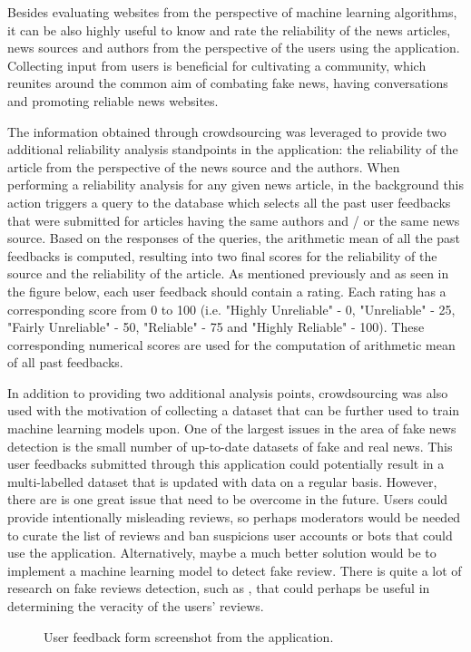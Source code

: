Besides evaluating websites from the perspective of machine learning algorithms, it can be also highly useful to know and rate the reliability of the news articles, news sources and authors from the perspective of the users using the application. Collecting input from users is beneficial for cultivating a community, which reunites around the common aim of combating fake news, having conversations and promoting reliable news websites.

The information obtained through crowdsourcing was leveraged to provide two additional reliability analysis standpoints in the application: the reliability of the article from the perspective of the news source and the authors. When performing a reliability analysis for any given news article, in the background this action triggers a query to the database which selects all the past user feedbacks that were submitted for articles having the same authors and / or the same news source. Based on the responses of the queries, the arithmetic mean of all the past feedbacks is computed, resulting into two final scores for the reliability of the source and the reliability of the article. As mentioned previously and as seen in the figure below, each user feedback should contain a rating. Each rating has a corresponding score from 0 to 100 (i.e. "Highly Unreliable" - 0, "Unreliable" - 25, "Fairly Unreliable" - 50, "Reliable" - 75 and "Highly Reliable" - 100). These corresponding numerical scores are used for the computation of arithmetic mean of all past feedbacks.

In addition to providing two additional analysis points, crowdsourcing was also used with the motivation of collecting a dataset that can be further used to train machine learning models upon. One of the largest issues in the area of fake news detection is the small number of up-to-date datasets of fake and real news. This user feedbacks submitted through this application could potentially result in a multi-labelled dataset that is updated with data on a regular basis. However, there are is one great issue that need to be overcome in the future. Users could provide intentionally misleading reviews, so perhaps moderators would be needed to curate the list of reviews and ban suspicions user accounts or bots that could use the application. Alternatively, maybe a much better solution would be to implement a machine learning model to detect fake review. There is quite a lot of research on fake reviews detection, such as \cite{a11}\cite{a12}, that could perhaps be useful in determining the veracity of the users' reviews.

\begin{figure}[H]
  \centering
  \caption{User feedback form screenshot from the application.}
\end{figure}